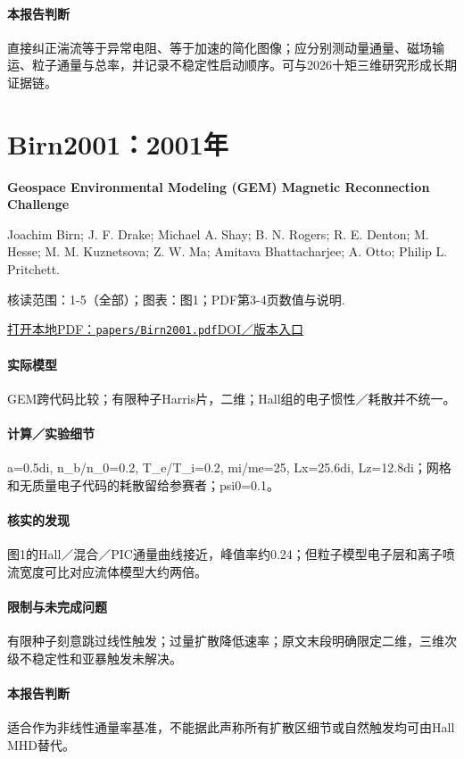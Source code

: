 \paragraph{本报告判断}直接纠正湍流等于异常电阻、等于加速的简化图像；应分别测动量通量、磁场输运、粒子通量与总率，并记录不稳定性启动顺序。可与2026十矩三维研究形成长期证据链。

\section{Birn2001：2001年}\label{paper:Birn2001}

\textbf{Geospace Environmental Modeling (GEM) Magnetic Reconnection Challenge}\citep{Birn2001}\

Joachim Birn;  J. F. Drake;  Michael A. Shay;  B. N. Rogers;  R. E. Denton;  M. Hesse;  M. M. Kuznetsova;  Z. W. Ma;  Amitava Bhattacharjee;  A. Otto;  Philip L. Pritchett.

\textsf{核读范围：}1-5（全部）；\textsf{图表：}图1；PDF第3-4页数值与说明.

\href{run:papers/Birn2001.pdf}{打开本地PDF：\texttt{papers/Birn2001.pdf}}\quad\href{https://doi.org/10.1029/1999ja900449}{DOI／版本入口}

\paragraph{实际模型}GEM跨代码比较；有限种子Harris片，二维；Hall组的电子惯性／耗散并不统一。

\paragraph{计算／实验细节}a=0.5di, n\_b/n\_0=0.2, T\_e/T\_i=0.2, mi/me=25, Lx=25.6di, Lz=12.8di；网格和无质量电子代码的耗散留给参赛者；psi0=0.1。

\paragraph{核实的发现}图1的Hall／混合／PIC通量曲线接近，峰值率约0.24；但粒子模型电子层和离子喷流宽度可比对应流体模型大约两倍。

\paragraph{限制与未完成问题}有限种子刻意跳过线性触发；过量扩散降低速率；原文末段明确限定二维，三维次级不稳定性和亚暴触发未解决。

\paragraph{本报告判断}适合作为非线性通量率基准，不能据此声称所有扩散区细节或自然触发均可由Hall MHD替代。

